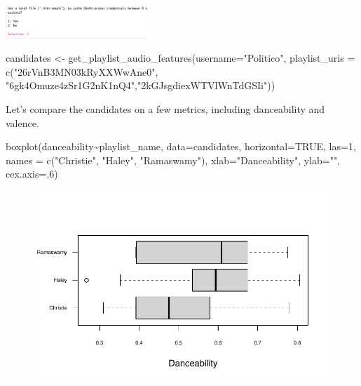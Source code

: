\documentclass[
  letterpaper,
  DIV=11,
  numbers=noendperiod]{scrreprt}
\newenvironment{Shaded}{\begin{snugshade}}{\end{snugshade}}
\newcommand{\AttributeTok}[1]{\textcolor[rgb]{0.40,0.45,0.13}{#1}}
\newcommand{\ConstantTok}[1]{\textcolor[rgb]{0.56,0.35,0.01}{#1}}
\newcommand{\DecValTok}[1]{\textcolor[rgb]{0.68,0.00,0.00}{#1}}
\newcommand{\FunctionTok}[1]{\textcolor[rgb]{0.28,0.35,0.67}{#1}}
\newcommand{\NormalTok}[1]{\textcolor[rgb]{0.00,0.23,0.31}{#1}}
\newcommand{\OtherTok}[1]{\textcolor[rgb]{0.00,0.23,0.31}{#1}}
\newcommand{\SpecialCharTok}[1]{\textcolor[rgb]{0.37,0.37,0.37}{#1}}
\newcommand{\StringTok}[1]{\textcolor[rgb]{0.13,0.47,0.30}{#1}}
\begin{document}
\includegraphics[width=0.4\textwidth,height=\textheight]{images/cachespot.png}

\begin{Shaded}
\begin{Highlighting}[]
\NormalTok{candidates }\OtherTok{\textless{}{-}} \FunctionTok{get\_playlist\_audio\_features}\NormalTok{(}\AttributeTok{username=}\StringTok{"Politico"}\NormalTok{,}
                            \AttributeTok{playlist\_uris =} \FunctionTok{c}\NormalTok{(}\StringTok{"26rVnB3MN03kRyXXWwAne0"}\NormalTok{, }\StringTok{"6gk4Omuze4zSr1G2nK1nQ4"}\NormalTok{,}\StringTok{"2kGJsgdiexWTVlWnTdGSIi"}\NormalTok{))}
\end{Highlighting}
\end{Shaded}

Let's compare the candidates on a few metrics, including danceability
and valence.

\begin{Shaded}
\begin{Highlighting}[]
\FunctionTok{boxplot}\NormalTok{(danceability}\SpecialCharTok{\textasciitilde{}}\NormalTok{playlist\_name, }\AttributeTok{data=}\NormalTok{candidates, }\AttributeTok{horizontal=}\ConstantTok{TRUE}\NormalTok{, }\AttributeTok{las=}\DecValTok{1}\NormalTok{, }
        \AttributeTok{names =} \FunctionTok{c}\NormalTok{(}\StringTok{"Christie"}\NormalTok{, }\StringTok{"Haley"}\NormalTok{,}
                                                                                \StringTok{"Ramaswamy"}\NormalTok{), }
        \AttributeTok{xlab=}\StringTok{"Danceability"}\NormalTok{, }\AttributeTok{ylab=}\StringTok{""}\NormalTok{,}
        \AttributeTok{cex.axis=}\NormalTok{.}\DecValTok{6}\NormalTok{)}
\end{Highlighting}
\end{Shaded}

\begin{figure}[H]

{\centering \includegraphics{11-TextasData_files/figure-pdf/unnamed-chunk-29-1.pdf}

}

\end{figure}
\end{document}
